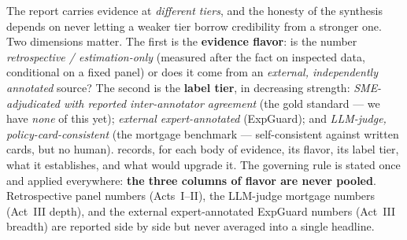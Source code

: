 The report carries evidence at \emph{different tiers}, and the honesty of the synthesis depends on never letting a weaker tier borrow credibility from a stronger one. Two dimensions matter. The first is the \textbf{evidence flavor}: is the number \emph{retrospective / estimation-only} (measured after the fact on inspected data, conditional on a fixed panel) or does it come from an \emph{external, independently annotated} source? The second is the \textbf{label tier}, in decreasing strength: \emph{SME-adjudicated with reported inter-annotator agreement} (the gold standard --- we have \emph{none} of this yet); \emph{external expert-annotated} (ExpGuard); and \emph{LLM-judge, policy-card-consistent} (the mortgage benchmark --- self-consistent against written cards, but no human).  records, for each body of evidence, its flavor, its label tier, what it establishes, and what would upgrade it. The governing rule is stated once and applied everywhere: \textbf{the three columns of flavor are never pooled}. Retrospective panel numbers (Acts~I--II), the LLM-judge mortgage numbers (Act~III depth), and the external expert-annotated ExpGuard numbers (Act~III breadth) are reported side by side but never averaged into a single headline.

